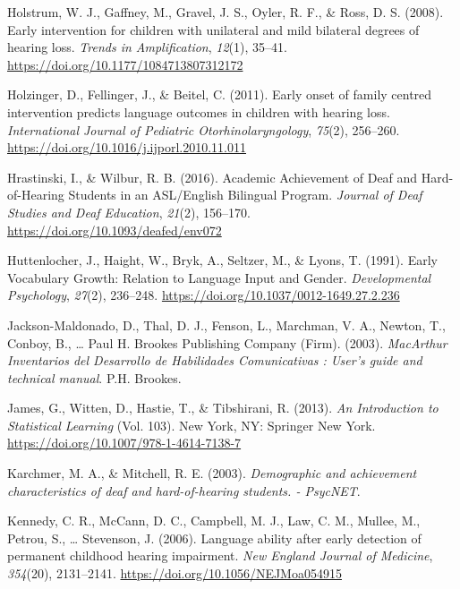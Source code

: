 \documentclass[english,man]{apa6}
\begin{document}
\leavevmode\hypertarget{ref-holstrum2008}{}%
Holstrum, W. J., Gaffney, M., Gravel, J. S., Oyler, R. F., \& Ross, D. S. (2008). Early intervention for children with unilateral and mild bilateral degrees of hearing loss. \emph{Trends in Amplification}, \emph{12}(1), 35--41. \url{https://doi.org/10.1177/1084713807312172}

\leavevmode\hypertarget{ref-holzinger2011}{}%
Holzinger, D., Fellinger, J., \& Beitel, C. (2011). Early onset of family centred intervention predicts language outcomes in children with hearing loss. \emph{International Journal of Pediatric Otorhinolaryngology}, \emph{75}(2), 256--260. \url{https://doi.org/10.1016/j.ijporl.2010.11.011}

\leavevmode\hypertarget{ref-hrastinski2016}{}%
Hrastinski, I., \& Wilbur, R. B. (2016). Academic Achievement of Deaf and Hard-of-Hearing Students in an ASL/English Bilingual Program. \emph{Journal of Deaf Studies and Deaf Education}, \emph{21}(2), 156--170. \url{https://doi.org/10.1093/deafed/env072}

\leavevmode\hypertarget{ref-huttenlocher1991}{}%
Huttenlocher, J., Haight, W., Bryk, A., Seltzer, M., \& Lyons, T. (1991). Early Vocabulary Growth: Relation to Language Input and Gender. \emph{Developmental Psychology}, \emph{27}(2), 236--248. \url{https://doi.org/10.1037/0012-1649.27.2.236}

\leavevmode\hypertarget{ref-jackson-maldonado2003}{}%
Jackson-Maldonado, D., Thal, D. J., Fenson, L., Marchman, V. A., Newton, T., Conboy, B., \ldots{} Paul H. Brookes Publishing Company (Firm). (2003). \emph{MacArthur Inventarios del Desarrollo de Habilidades Comunicativas : User's guide and technical manual}. P.H. Brookes.

\leavevmode\hypertarget{ref-james2013}{}%
James, G., Witten, D., Hastie, T., \& Tibshirani, R. (2013). \emph{An Introduction to Statistical Learning} (Vol. 103). New York, NY: Springer New York. \url{https://doi.org/10.1007/978-1-4614-7138-7}

\leavevmode\hypertarget{ref-karchmer2003}{}%
Karchmer, M. A., \& Mitchell, R. E. (2003). \emph{Demographic and achievement characteristics of deaf and hard-of-hearing students. - PsycNET}.

\leavevmode\hypertarget{ref-kennedy2006}{}%
Kennedy, C. R., McCann, D. C., Campbell, M. J., Law, C. M., Mullee, M., Petrou, S., \ldots{} Stevenson, J. (2006). Language ability after early detection of permanent childhood hearing impairment. \emph{New England Journal of Medicine}, \emph{354}(20), 2131--2141. \url{https://doi.org/10.1056/NEJMoa054915}
\end{document}
